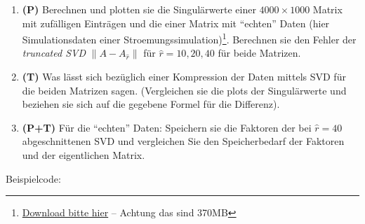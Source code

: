 \documentclass[]{book}
\providecommand{\tightlist}{%
  \setlength{\itemsep}{0pt}\setlength{\parskip}{0pt}}
\theoremstyle{definition}
\theoremstyle{definition}
\theoremstyle{definition}
\theoremstyle{definition}
\theoremstyle{remark}
\begin{document}
\begin{enumerate}
\def\labelenumi{\arabic{enumi}.}
\tightlist
\item
  \textbf{(P)} Berechnen und plotten sie die Singulärwerte einer \(4000\times 1000\) Matrix mit zufälligen Einträgen und die einer Matrix mit ``echten'' Daten (hier Simulationsdaten einer Stroemungssimulation)\footnote{\href{https://owncloud.gwdg.de/index.php/s/sAjEy9B8kIbzoYj}{Download bitte hier} -- Achtung das sind 370MB}. Berechnen sie den Fehler der \emph{truncated SVD} \(\|A-A_{\hat r}\|\) für \(\hat r = 10, 20, 40\) für beide Matrizen.
\item
  \textbf{(T)} Was lässt sich bezüglich einer Kompression der Daten mittels SVD für die beiden Matrizen sagen. (Vergleichen sie die plots der Singulärwerte und beziehen sie sich auf die gegebene Formel für die Differenz).
\item
  \textbf{(P+T)} Für die ``echten'' Daten: Speichern sie die Faktoren der bei \(\hat r=40\) abgeschnittenen SVD und vergleichen Sie den Speicherbedarf der Faktoren und der eigentlichen Matrix.
\end{enumerate}

Beispielcode:
\end{document}
